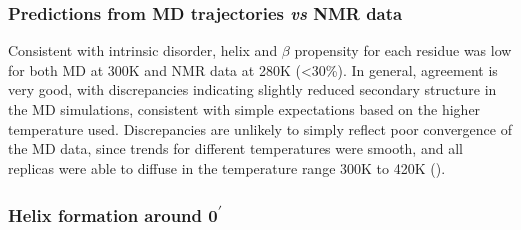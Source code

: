 \documentclass[10pt,letterpaper]{article}
\begin{document}
\subsubsection*{Predictions from MD trajectories {\it vs} NMR data} 

Consistent with intrinsic disorder, helix and $\beta$ propensity for each residue was low for both MD at 300K and NMR data at 280K (\textless  30\%). In general, agreement is very good, with discrepancies indicating slightly reduced secondary structure in the MD simulations, consistent with simple expectations based on the higher temperature used. 
Discrepancies are unlikely to simply reflect poor convergence of the MD data, since trends for different temperatures were smooth, and all replicas were able to diffuse in the temperature range 300K to 420K ().




\subsubsection*{Helix formation around 0\textsuperscript{$\prime$}}
\end{document}
